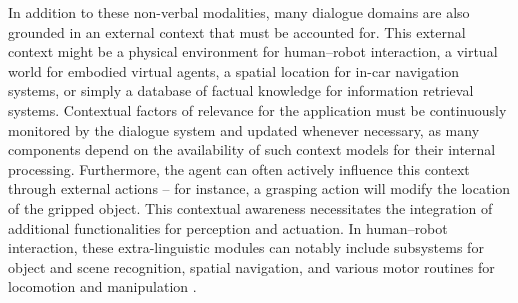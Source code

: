 In addition to these non-verbal modalities, many dialogue domains are also grounded in an external context that must be accounted for.  This external context might be a physical environment for human--robot interaction, a virtual world for embodied virtual agents, a spatial location for in-car navigation systems, or simply a database of factual knowledge for information retrieval systems. Contextual factors of relevance for the application must be continuously monitored by the dialogue system and updated whenever necessary, as many components depend on the availability of such context models for their internal processing.  Furthermore, the agent can often actively influence this context through external actions -- for instance, a grasping action will modify the location of the gripped object.   This contextual awareness necessitates the integration of additional functionalities for perception and actuation. In human--robot interaction, these extra-linguistic modules can notably include subsystems for object and scene recognition, spatial navigation, and various motor routines for locomotion and manipulation \citep[see][for a survey of the field]{goodrich2007human}. 

